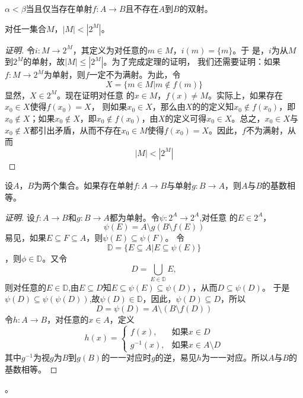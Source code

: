   $\alpha < \beta$当且仅当存在单射$f:A \to B$且不存在$A$到$B$的双射。

  \begin{Thm}[康托]
    对任一集合$M$，$|M| < |2^{M}|$。
  \end{Thm}
  \begin{proof}[证明]
    令$i:M\to
    2^M$，其定义为对任意的$m\in M$，$i(m)=\{m\}$。于
    是，$i$为从$M$到$2^M$的单射，故$|M|\leq |2^M|$。为了完成定理的证明，
    我们还需要证明：如果$f:M\to 2^M$为单射，则$f$一定不为满射。为此，令
    \[X=\{m\in M|m \notin f(m)\}\]显然，$X\in 2^M$。现在证明对任意
    的$x\in M$，$f(x)\neq M$。实际上，如果存在$x_0\in X$使得$f(x_0)=X$，
    则如果$x_0\in X$，那么由$X$的的定义知$x_0\notin
    f(x_0)$，即$x_0\notin X$；如果$x_0\notin X$，即$x_0\notin f(x_0)$，由$X$的定义可得$x_0\in X$。总之，$x_0\in X$与$x_0\notin X$都引出矛盾，从而不存在$x_0\in M$使得$f(x_0)=X$。因此，$f$不为满射，从而
    \[|M|<|2^M|\]
  \end{proof}
  \begin{Thm}[康托-伯恩斯坦]
    设$A$，$B$为两个集合。如果存在单射$f:A\to B$与单射$g:B\to A$，则$A$与$B$的基数相等。
  \end{Thm}

  \begin{proof}[证明]
    设$f:A\to B$和$g:B\to A$都为单射。令$\psi:2^A\to 2^A$,对任意
    的$E\in 2^A$，\[\psi(E)=A\setminus g(B\setminus f(E))\]易见，如果$E\subseteq F\subseteq A$，则$\psi(E)\subseteq \psi(F)$。
    令\[\mathbb{D}=\{E\subseteq A|E\subseteq \psi(E)\}\]，则$\phi\in \mathbb{D}$。又令
    \[D=\bigcup_{E\in \mathbb{D}}E,\]
    则对任意的$E\in \mathbb{D}$,由$E\subseteq D$知$E\subseteq \psi(E) \subseteq \psi(D)$，从而$D\subseteq \psi(D)$。
    于是$\psi(D)\subseteq \psi(\psi(D))$,故$\psi(D)\in \mathbb{D}$，因此，$\psi(D)\subseteq D$，所以
    \[D=\psi(D)=A\setminus(B\setminus f(D))\]
    令$h:A\to B$，对任意的$x\in A$，定义
    \[h(x)=\begin{cases}
        f(x),&\text{如果}x\in D\\
        g^{-1}(x),&\text{如果}x\in A\setminus D
      \end{cases}
    \]
    其中$g^{-1}$为视$g$为$B$到$g(B)$的一一对应时$g$的逆，易见$h$为一一对应。所以$A$与$B$的基数相等。
  \end{proof}。


